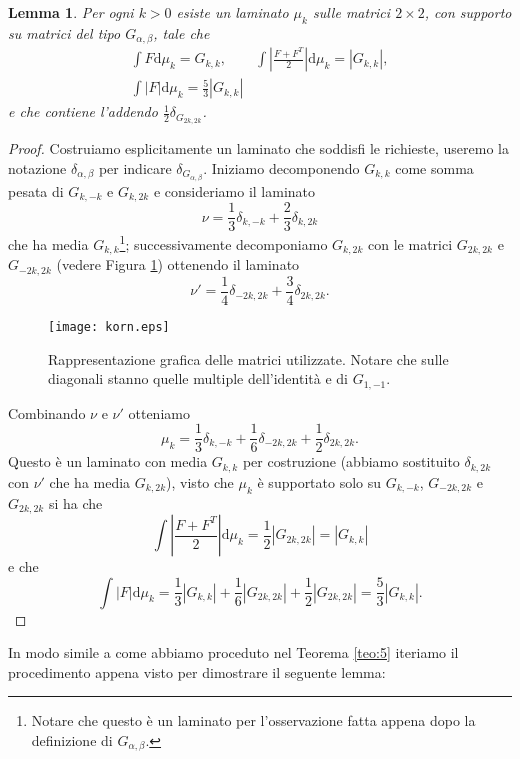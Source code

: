 \documentclass[a4paper,11pt]{book}
\theoremstyle{plain}
\newtheorem{lemma}[teo]{Lemma}
\theoremstyle{definition}
\theoremstyle{remark}
\newcommand{\diff}{\text{d}}
\begin{document}
\begin{lemma}\label{lemma:2}
	Per ogni $k>0$ esiste un laminato $\mu_k$ sulle matrici $2\times 2$, con supporto su matrici del tipo $G_{\alpha,\beta}$, tale che
	\begin{gather*}
		\int F\diff \mu_k = G_{k,k},\qquad\int\left|\frac{F+F^T}{2}\right|\diff \mu_k = |G_{k,k}|,\\
		\int|F|\diff\mu_k = \frac{5}{3}|G_{k,k}|
	\end{gather*}
	e che contiene l'addendo $\frac{1}{2}\delta_{G_{2k,2k}}$.
\end{lemma}
\begin{proof}
	Costruiamo esplicitamente un laminato che soddisfi le richieste, useremo la notazione $\delta_{\alpha,\beta}$ per indicare $\delta_{G_{\alpha,\beta}}$. Iniziamo decomponendo $G_{k,k}$ come somma pesata di $G_{k,-k}$ e $G_{k,2k}$ e consideriamo il laminato
	\[\nu = \frac{1}{3}\delta_{k,-k}+\frac{2}{3}\delta_{k,2k}\]
	che ha media $G_{k,k}$\footnote{Notare che questo è un laminato per l'osservazione fatta appena dopo la definizione di $G_{\alpha,\beta}$.}; successivamente decomponiamo $G_{k,2k}$ con le matrici $G_{2k,2k}$ e $G_{-2k,2k}$ (vedere Figura \ref{fig:2}) ottenendo il laminato
	\[
		\nu'=\frac{1}{4}\delta_{-2k,2k}+\frac{3}{4}\delta_{2k,2k}.
	\]
	\begin{figure}[H]
		\begin{minipage}[c]{0.66\textwidth}
			\texttt{[image: korn.eps]}
		\end{minipage}\hfill
		\begin{minipage}[c]{0.3\textwidth}
			\caption{Rappresentazione grafica delle matrici utilizzate. Notare che sulle diagonali stanno quelle multiple dell'identità e di $G_{1,-1}$.}
			\label{fig:2}
		\end{minipage}
	\end{figure}
	Combinando $\nu$ e $\nu'$ otteniamo
	\[
		\mu_k = \frac{1}{3}\delta_{k,-k}+\frac{1}{6}\delta_{-2k,2k}+\frac{1}{2}\delta_{2k,2k}.
	\]
	Questo è un laminato con media $G_{k,k}$ per costruzione (abbiamo sostituito $\delta_{k,2k}$ con $\nu'$ che ha media $G_{k,2k}$), visto che $\mu_k$ è supportato solo su $G_{k,-k}$, $G_{-2k,2k}$ e $G_{2k,2k}$ si ha che
	\[
		\int \left|\frac{F+F^T}{2}\right|\diff \mu_k = \frac{1}{2}|G_{2k,2k}| = |G_{k,k}|
	\]
	e che
	\[
		\int |F|\diff\mu_k = \frac{1}{3}|G_{k,k}|+\frac{1}{6}|G_{2k,2k}|+\frac{1}{2}|G_{2k,2k}| = \frac{5}{3}|G_{k,k}|.
	\]
\end{proof}
In modo simile a come abbiamo proceduto nel Teorema \ref{teo:5} iteriamo il procedimento appena visto per dimostrare il seguente lemma:
\end{document}
